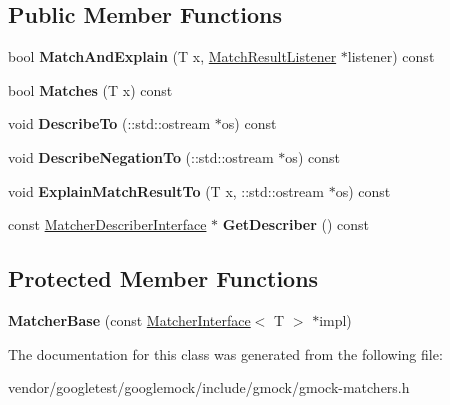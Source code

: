 \subsection*{Public Member Functions}
\begin{DoxyCompactItemize}
\item 
\mbox{\label{classtesting_1_1internal_1_1_matcher_base_a08429a6d7e7d330de4a4eb4e272105a7}} 
bool {\bfseries Match\+And\+Explain} (T x, \hyperlink{classtesting_1_1_match_result_listener}{Match\+Result\+Listener} $\ast$listener) const
\item 
\mbox{\label{classtesting_1_1internal_1_1_matcher_base_a3b479673ff40cac1a7d548e91d789cb2}} 
bool {\bfseries Matches} (T x) const
\item 
\mbox{\label{classtesting_1_1internal_1_1_matcher_base_a7e0c883c7745e0d646463077ef1c1267}} 
void {\bfseries Describe\+To} (\+::std\+::ostream $\ast$os) const
\item 
\mbox{\label{classtesting_1_1internal_1_1_matcher_base_ac1089d49b6b8a381900618985cd69b7f}} 
void {\bfseries Describe\+Negation\+To} (\+::std\+::ostream $\ast$os) const
\item 
\mbox{\label{classtesting_1_1internal_1_1_matcher_base_ad7815191a01d24e20eda2e0057d33aa3}} 
void {\bfseries Explain\+Match\+Result\+To} (T x, \+::std\+::ostream $\ast$os) const
\item 
\mbox{\label{classtesting_1_1internal_1_1_matcher_base_a9b816eb60ee16780703768d704c105e3}} 
const \hyperlink{classtesting_1_1_matcher_describer_interface}{Matcher\+Describer\+Interface} $\ast$ {\bfseries Get\+Describer} () const
\end{DoxyCompactItemize}
\subsection*{Protected Member Functions}
\begin{DoxyCompactItemize}
\item 
\mbox{\label{classtesting_1_1internal_1_1_matcher_base_aed3e080f12ea7bde535ddf02b6f66922}} 
{\bfseries Matcher\+Base} (const \hyperlink{classtesting_1_1_matcher_interface}{Matcher\+Interface}$<$ T $>$ $\ast$impl)
\end{DoxyCompactItemize}


The documentation for this class was generated from the following file\+:\begin{DoxyCompactItemize}
\item 
vendor/googletest/googlemock/include/gmock/gmock-\/matchers.\+h\end{DoxyCompactItemize}
